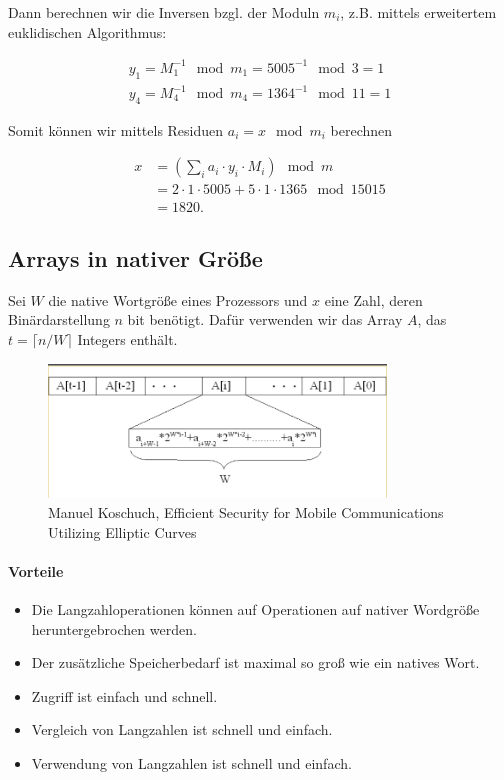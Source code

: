 Dann berechnen wir die Inversen bzgl. der Moduln $m_i$, z.B. mittels erweitertem euklidischen Algorithmus:

\begin{align*}
    y_1 = M_1^{-1} \mod m_1 = 5005^{-1} \mod 3 = 1 \\
    y_4 = M_4^{-1} \mod m_4 = 1364^{-1} \mod 11 = 1
\end{align*}

Somit können wir mittels Residuen $a_i = x \mod m_i$ berechnen 

\begin{align*}
    x &= \left(\sum_i a_i \cdot y_i \cdot M_i \right) \mod m \\
      &= 2\cdot 1 \cdot 5005 + 5 \cdot 1 \cdot 1365 \mod 15015 \\ 
      &= 1820.
\end{align*}

\subsection{Arrays in nativer Größe}

Sei $W$ die native Wortgröße eines Prozessors und $x$ eine Zahl, deren Binärdarstellung $n$ bit benötigt. Dafür verwenden wir das Array $A$, das $t = \lceil n/W \rceil$ Integers enthält.

\begin{figure}[h]
    \includegraphics[width=0.8\textwidth]{figures/fig1-arrays-native-size}
    \centering
    \caption{Manuel Koschuch, Efficient Security for Mobile Communications Utilizing Elliptic Curves}
\end{figure}

\paragraph{Vorteile}

\begin{itemize}
    \item Die Langzahloperationen können auf Operationen auf nativer Wordgröße heruntergebrochen werden.
    \item Der zusätzliche Speicherbedarf ist maximal so groß wie ein natives Wort.
    \item Zugriff ist einfach und schnell.
    \item Vergleich von Langzahlen ist schnell und einfach.
    \item Verwendung von Langzahlen ist schnell und einfach.
\end{itemize}

